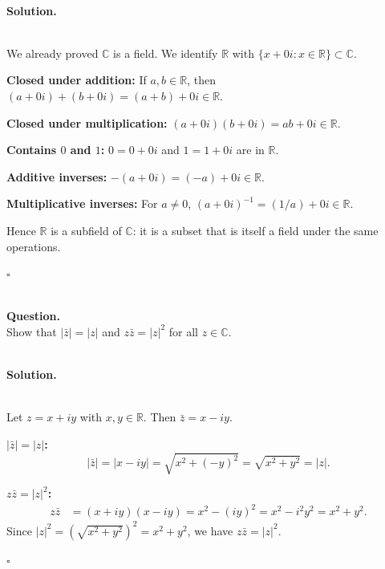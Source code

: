 \documentclass{article}
\begin{document}
\noindent\\
\textbf{Solution.}\\
\quad\\
\begin{mdframed}[linewidth=1pt]
We already proved $\mathbb{C}$ is a field. We identify $\mathbb{R}$ with $\{x + 0i : x \in \mathbb{R}\} \subset \mathbb{C}$.

\textbf{Closed under addition:} If $a, b \in \mathbb{R}$, then $(a + 0i) + (b + 0i) = (a+b) + 0i \in \mathbb{R}$.

\textbf{Closed under multiplication:} $(a + 0i)(b + 0i) = ab + 0i \in \mathbb{R}$.

\textbf{Contains $0$ and $1$:} $0 = 0 + 0i$ and $1 = 1 + 0i$ are in $\mathbb{R}$.

\textbf{Additive inverses:} $-(a + 0i) = (-a) + 0i \in \mathbb{R}$.

\textbf{Multiplicative inverses:} For $a \neq 0$, $(a + 0i)^{-1} = (1/a) + 0i \in \mathbb{R}$.

Hence $\mathbb{R}$ is a subfield of $\mathbb{C}$: it is a subset that is itself a field under the same operations.

\hfill $\square$
\end{mdframed}

\bigskip

\hfill \break  $~\!\!$ \dotfill \medskip \\
\textbf{Question.}\\
Show that $|\bar{z}| = |z|$ and $z\bar{z} = |z|^2$ for all $z \in \mathbb{C}$.

\noindent\\
\textbf{Solution.}\\
\quad\\
\begin{mdframed}[linewidth=1pt]
Let $z = x + iy$ with $x, y \in \mathbb{R}$. Then $\bar{z} = x - iy$.

\textbf{$|\bar{z}| = |z|$:}
\[
|\bar{z}| = |x - iy| = \sqrt{x^2 + (-y)^2} = \sqrt{x^2 + y^2} = |z|.
\]

\textbf{$z\bar{z} = |z|^2$:}
\begin{align*}
z\bar{z} &= (x + iy)(x - iy) = x^2 - (iy)^2 = x^2 - i^2 y^2 = x^2 + y^2.
\end{align*}
Since $|z|^2 = (\sqrt{x^2+y^2})^2 = x^2 + y^2$, we have $z\bar{z} = |z|^2$.

\hfill $\square$
\end{mdframed}

\bigskip
\end{document}

